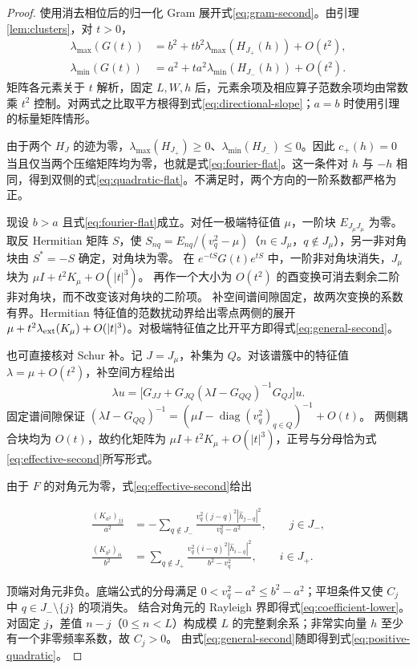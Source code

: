 \documentclass[UTF8,a4paper,zihao=-4,fontset=windows]{ctexart}
\theoremstyle{chinese}
\numberwithin{equation}{section}
\newcommand{\e}{e}\newcommand{\ii}{\mathrm i}
\newcommand{\diag}{\operatorname{diag}}
\begin{document}
\begin{proof}
使用消去相位后的归一化 Gram 展开式\eqref{eq:gram-second}。由引理\ref{lem:clusters}，对 $t>0$，
\begin{align*}
\lambda_{\max}(G(t))&=b^2+t b^2\lambda_{\max}(H_{J_+}(h))+O(t^2),\\
\lambda_{\min}(G(t))&=a^2+t a^2\lambda_{\min}(H_{J_-}(h))+O(t^2).
\end{align*}
矩阵各元素关于 $t$ 解析，固定 $L,W,h$ 后，元素余项及相应算子范数余项均由常数乘 $t^2$ 控制。对两式之比取平方根得到式\eqref{eq:directional-slope}；$a=b$ 时使用引理的标量矩阵情形。

由于两个 $H_J$ 的迹为零，$\lambda_{\max}(H_{J_+})\ge0$、$\lambda_{\min}(H_{J_-})\le0$。因此 $c_+(h)=0$ 当且仅当两个压缩矩阵均为零，也就是式\eqref{eq:fourier-flat}。这一条件对 $h$ 与 $-h$ 相同，得到双侧的式\eqref{eq:quadratic-flat}。不满足时，两个方向的一阶系数都严格为正。

现设 $b>a$ 且式\eqref{eq:fourier-flat}成立。对任一极端特征值 $\mu$，一阶块 $E_{J_\mu J_\mu}$ 为零。
取反 Hermitian 矩阵 $S$，使 $S_{nq}=E_{nq}/(v_q^2-\mu)$（$n\in J_\mu$，$q\notin J_\mu$），另一非对角块由 $S^*=-S$ 确定，对角块为零。
在 $\e^{-tS}G(t)\e^{tS}$ 中，一阶非对角块消失，$J_\mu$ 块为 $\mu I+t^2K_\mu+O(|t|^3)$。
再作一个大小为 $O(t^2)$ 的酉变换可消去剩余二阶非对角块，而不改变该对角块的二阶项。
补空间谱间隙固定，故两次变换的系数有界。Hermitian 特征值的范数扰动界给出零点两侧的展开
$\mu+t^2\lambda_{\rm ext}(K_\mu)+O(|t|^3)$。对极端特征值之比开平方即得式\eqref{eq:general-second}。

也可直接核对 Schur 补。记 $J=J_\mu$，补集为 $Q$。对该谱簇中的特征值 $\lambda=\mu+O(t^2)$，补空间方程给出
\[
\lambda u=\bigl[G_{JJ}+G_{JQ}(\lambda I-G_{QQ})^{-1}G_{QJ}\bigr]u.
\]
固定谱间隙保证 $(\lambda I-G_{QQ})^{-1}=(\mu I-\diag(v_q^2)_{q\in Q})^{-1}+O(t)$。
两侧耦合块均为 $O(t)$，故约化矩阵为 $\mu I+t^2K_\mu+O(|t|^3)$，正号与分母恰为式\eqref{eq:effective-second}所写形式。


由于 $F$ 的对角元为零，式\eqref{eq:effective-second}给出

\begin{align*}
\frac{(K_{a^2})_{jj}}{a^2}
&=-\sum_{q\notin J_-}\frac{v_q^2(j-q)^2|\widehat h_{j-q}|^2}{v_q^2-a^2},\qquad j\in J_-,\\
\frac{(K_{b^2})_{ii}}{b^2}
&=\sum_{q\notin J_+}\frac{v_q^2(i-q)^2|\widehat h_{i-q}|^2}{b^2-v_q^2},\qquad i\in J_+.
\end{align*}

顶端对角元非负。底端公式的分母满足 $0<v_q^2-a^2\le b^2-a^2$；平坦条件又使 $C_j$ 中 $q\in J_-\setminus\{j\}$ 的项消失。
结合对角元的 Rayleigh 界即得式\eqref{eq:coefficient-lower}。
对固定 $j$，差值 $n-j$（$0\le n<L$）构成模 $L$ 的完整剩余系；非常实向量 $h$ 至少有一个非零频率系数，故 $C_j>0$。
由式\eqref{eq:general-second}随即得到式\eqref{eq:positive-quadratic}。


\end{proof}
\end{document}
